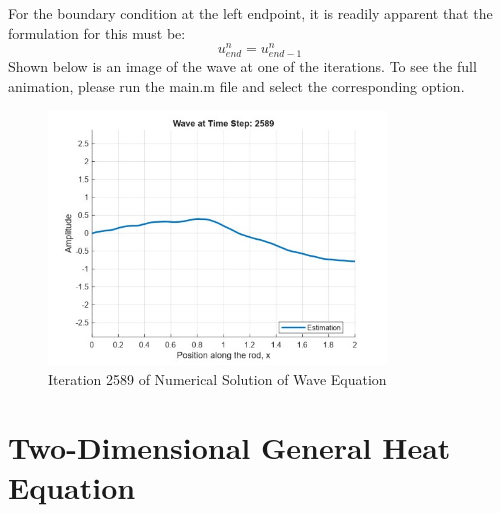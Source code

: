 \documentclass{article}
\begin{document}
For the boundary condition at the left endpoint, it is readily apparent that the formulation for this must be:
\begin{equation}
    u_{end}^n = u_{end-1}^n
\end{equation}
Shown below is an image of the wave at one of the iterations. To see the full animation, please run the main.m file and select the corresponding option.
\begin{figure}[H]
    \centering
    \includegraphics[width=0.8\textwidth]{wave_example.jpg}
    \caption{Iteration 2589 of Numerical Solution of Wave Equation}
\end{figure}

\section{Two-Dimensional General Heat Equation}
\end{document}
